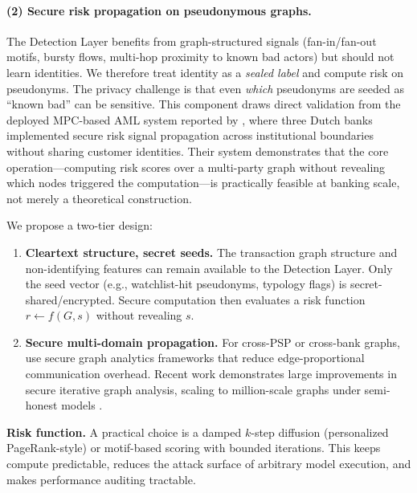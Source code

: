 \documentclass[11pt]{article}
\begin{document}
\paragraph{(2) Secure risk propagation on pseudonymous graphs.}
The Detection Layer benefits from graph-structured signals (fan-in/fan-out motifs, bursty flows, multi-hop proximity to known bad actors) but should not learn identities. We therefore treat identity as a \emph{sealed label} and compute risk on pseudonyms. The privacy challenge is that even \emph{which} pseudonyms are seeded as ``known bad'' can be sensitive. This component draws direct validation from the deployed MPC-based AML system reported by \citet{vanEgmond2024}, where three Dutch banks implemented secure risk signal propagation across institutional boundaries without sharing customer identities. Their system demonstrates that the core operation---computing risk scores over a multi-party graph without revealing which nodes triggered the computation---is practically feasible at banking scale, not merely a theoretical construction.

We propose a two-tier design:
\begin{enumerate}
    \item \textbf{Cleartext structure, secret seeds.} The transaction graph structure and non-identifying features can remain available to the Detection Layer. Only the seed vector (e.g., watchlist-hit pseudonyms, typology flags) is secret-shared/encrypted. Secure computation then evaluates a risk function $r \leftarrow f(G, s)$ without revealing $s$.
    \item \textbf{Secure multi-domain propagation.} For cross-PSP or cross-bank graphs, use secure graph analytics frameworks that reduce edge-proportional communication overhead. Recent work demonstrates large improvements in secure iterative graph analysis, scaling to million-scale graphs under semi-honest models \citep{Koti2024Graphiti,Yu2025GraphAce}.
\end{enumerate}

\textbf{Risk function.} A practical choice is a damped $k$-step diffusion (personalized PageRank-style) or motif-based scoring with bounded iterations. This keeps compute predictable, reduces the attack surface of arbitrary model execution, and makes performance auditing tractable.
\end{document}
